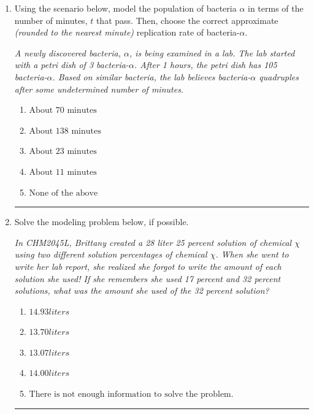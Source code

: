 \documentclass[14pt]{extbook}
\newcommand{\litem}[1]{\item#1\hspace*{-1cm}\rule{\textwidth}{0.4pt}}
\begin{document}
\begin{enumerate}
{\begin{enumerate}[label=\Alph*.]
\end{enumerate} }
\litem{
Using the scenario below, model the population of bacteria $\alpha$ in terms of the number of minutes, $t$ that pass. Then, choose the correct approximate \textit{(rounded to the nearest minute)} replication rate of bacteria-$\alpha$.
\begin{center}
    \textit{ A newly discovered bacteria, $\alpha$, is being examined in a lab. The lab started with a petri dish of 3 bacteria-$\alpha$. After 1 hours, the petri dish has 105 bacteria-$\alpha$. Based on similar bacteria, the lab believes bacteria-$\alpha$ quadruples after some undetermined number of minutes. }
\end{center}
\begin{enumerate}[label=\Alph*.]
\item \( \text{About } 70 \text{ minutes} \)
\item \( \text{About } 138 \text{ minutes} \)
\item \( \text{About } 23 \text{ minutes} \)
\item \( \text{About } 11 \text{ minutes} \)
\item \( \text{None of the above} \)

\end{enumerate} }
\litem{
Solve the modeling problem below, if possible.
\begin{center}
    \textit{ In CHM2045L, Brittany created a 28 liter 25 percent solution of chemical $\chi$ using two different solution percentages of chemical $\chi$. When she went to write her lab report, she realized she forgot to write the amount of each solution she used! If she remembers she used 17 percent and 32 percent solutions, what was the amount she used of the 32 percent solution? }
\end{center}
\begin{enumerate}[label=\Alph*.]
\item \( 14.93 liters \)
\item \( 13.70 liters \)
\item \( 13.07 liters \)
\item \( 14.00 liters \)
\item \( \text{There is not enough information to solve the problem.} \)


\end{enumerate}}
\end{enumerate}
\end{document}
